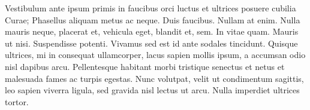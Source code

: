 \documentclass{cascadilla}
\begin{document}
Vestibulum ante ipsum primis in faucibus orci luctus et ultrices posuere
cubilia Curae; Phasellus aliquam metus ac neque. Duis faucibus. Nullam at
enim. Nulla mauris neque, placerat et, vehicula eget, blandit et, sem. In
vitae quam. Mauris ut nisi. Suspendisse potenti. Vivamus sed est id ante
sodales tincidunt. Quisque ultrices, mi in consequat ullamcorper, lacus sapien
mollis ipsum, a accumsan odio nisl dapibus arcu. Pellentesque habitant morbi
tristique senectus et netus et malesuada fames ac turpis egestas. Nunc
volutpat, velit ut condimentum sagittis, leo sapien viverra ligula, sed
gravida nisl lectus ut arcu. Nulla imperdiet ultrices tortor.

\end{document}
